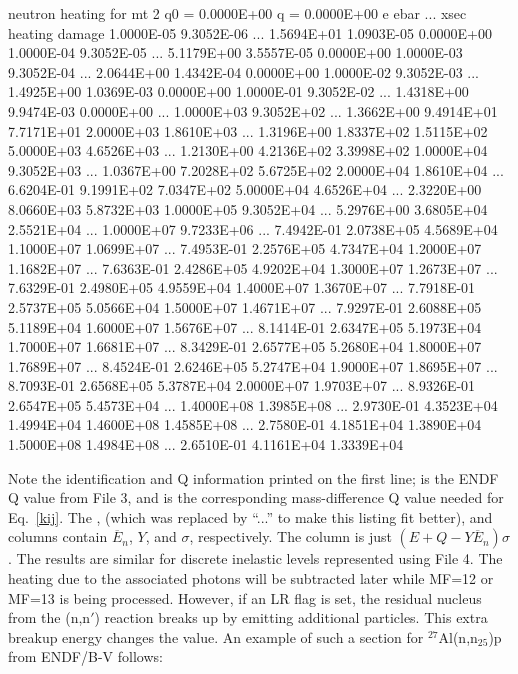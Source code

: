 \small
\begin{ccode}

 neutron heating for mt  2   q0 =  0.0000E+00     q =  0.0000E+00
            e          ebar   ...       xsec       heating        damage
   1.0000E-05    9.3052E-06   ... 1.5694E+01    1.0903E-05    0.0000E+00
   1.0000E-04    9.3052E-05   ... 5.1179E+00    3.5557E-05    0.0000E+00
   1.0000E-03    9.3052E-04   ... 2.0644E+00    1.4342E-04    0.0000E+00
   1.0000E-02    9.3052E-03   ... 1.4925E+00    1.0369E-03    0.0000E+00
   1.0000E-01    9.3052E-02   ... 1.4318E+00    9.9474E-03    0.0000E+00
     ...
   1.0000E+03    9.3052E+02   ... 1.3662E+00    9.4914E+01    7.7171E+01
   2.0000E+03    1.8610E+03   ... 1.3196E+00    1.8337E+02    1.5115E+02
   5.0000E+03    4.6526E+03   ... 1.2130E+00    4.2136E+02    3.3998E+02
   1.0000E+04    9.3052E+03   ... 1.0367E+00    7.2028E+02    5.6725E+02
   2.0000E+04    1.8610E+04   ... 6.6204E-01    9.1991E+02    7.0347E+02
   5.0000E+04    4.6526E+04   ... 2.3220E+00    8.0660E+03    5.8732E+03
   1.0000E+05    9.3052E+04   ... 5.2976E+00    3.6805E+04    2.5521E+04
     ...
   1.0000E+07    9.7233E+06   ... 7.4942E-01    2.0738E+05    4.5689E+04
   1.1000E+07    1.0699E+07   ... 7.4953E-01    2.2576E+05    4.7347E+04
   1.2000E+07    1.1682E+07   ... 7.6363E-01    2.4286E+05    4.9202E+04
   1.3000E+07    1.2673E+07   ... 7.6329E-01    2.4980E+05    4.9559E+04
   1.4000E+07    1.3670E+07   ... 7.7918E-01    2.5737E+05    5.0566E+04
   1.5000E+07    1.4671E+07   ... 7.9297E-01    2.6088E+05    5.1189E+04
   1.6000E+07    1.5676E+07   ... 8.1414E-01    2.6347E+05    5.1973E+04
   1.7000E+07    1.6681E+07   ... 8.3429E-01    2.6577E+05    5.2680E+04
   1.8000E+07    1.7689E+07   ... 8.4524E-01    2.6246E+05    5.2747E+04
   1.9000E+07    1.8695E+07   ... 8.7093E-01    2.6568E+05    5.3787E+04
   2.0000E+07    1.9703E+07   ... 8.9326E-01    2.6547E+05    5.4573E+04
     ...
   1.4000E+08    1.3985E+08   ... 2.9730E-01    4.3523E+04    1.4994E+04
   1.4600E+08    1.4585E+08   ... 2.7580E-01    4.1851E+04    1.3890E+04
   1.5000E+08    1.4984E+08   ... 2.6510E-01    4.1161E+04    1.3339E+04

\end{ccode}
\normalsize

\noindent
Note the identification and Q information printed on the first
line;  is the ENDF Q value from File 3, and  is
the corresponding mass-difference Q value needed for Eq.~\ref{kij}.
The ,  (which was replaced by ``...''
to make this listing fit better), and  columns contain
$\overline{E}_n$, $Y$, and $\sigma$, respectively.   The
 column is just $(E{+}Q{-}Y\overline{E}_n)\sigma$.
The results are similar for discrete inelastic levels represented
using File 4.  The heating due to the associated photons will be
subtracted later while MF=12 or MF=13 is being processed.  However,
if an LR flag is set, the residual nucleus from the (n,n$'$)
reaction breaks up by emitting additional particles.  This extra
breakup energy changes the  value.  An example of such
a section for $^{27}$Al(n,n$_{25}$)p from ENDF/B-V follows:

